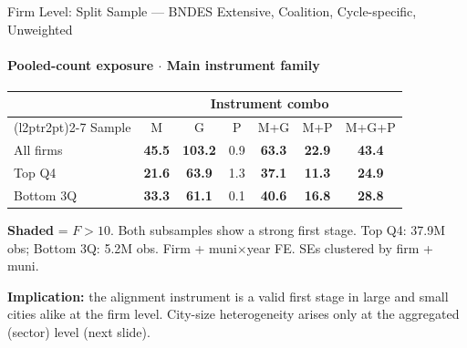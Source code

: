 \documentclass[aspectratio=169,10pt]{beamer}
\newcommand{\fpass}[1]{\cellcolor{pass}\textbf{#1}}
\begin{document}
\begin{frame}[t]{Firm Level: Split Sample --- BNDES Extensive, Coalition, Cycle-specific, Unweighted}
\framesubtitle{Pooled-count exposure $\cdot$ Main instrument family}
\begin{center}
\footnotesize
\setlength{\tabcolsep}{4pt}
\renewcommand{\arraystretch}{1.05}
\begin{tabular}{@{}lcccccc@{}}
\toprule
 & \multicolumn{6}{c}{Instrument combo} \\
\cmidrule(l{2pt}r{2pt}){2-7}
Sample & M & G & P & M+G & M+P & M+G+P \\
\midrule
All firms  & \fpass{45.5} & \fpass{103.2} & 0.9 & \fpass{63.3} & \fpass{22.9} & \fpass{43.4} \\
Top Q4     & \fpass{21.6} & \fpass{63.9}  & 1.3 & \fpass{37.1} & \fpass{11.3} & \fpass{24.9} \\
Bottom 3Q  & \fpass{33.3} & \fpass{61.1}  & 0.1 & \fpass{40.6} & \fpass{16.8} & \fpass{28.8} \\
\bottomrule
\end{tabular}
\end{center}
{\scriptsize \colorbox{pass}{\textbf{Shaded}} = $F>10$.
Both subsamples show a strong first stage.  Top Q4: 37.9M obs; Bottom 3Q: 5.2M obs.
Firm + muni$\times$year FE. SEs clustered by firm + muni.}
\vspace{0.8em}

\textcolor{alertred}{\footnotesize\textbf{Implication:} the alignment instrument is a valid first stage in large and small cities alike at the firm level. City-size heterogeneity arises only at the aggregated (sector) level (next slide).}
\end{frame}

\end{document}
